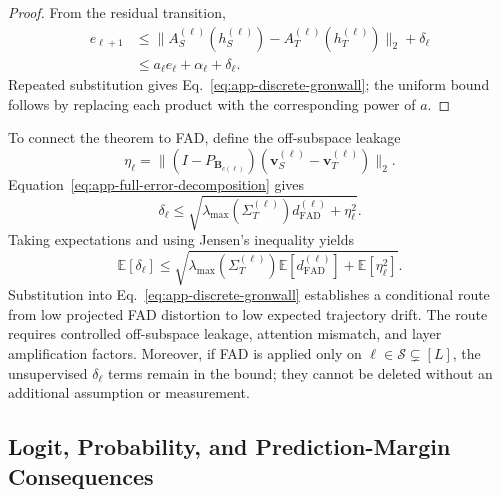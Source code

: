 \documentclass{article}
\newcommand{\E}{\mathbb{E}}
\newcommand{\calS}{\mathcal{S}}
\newcommand{\FAD}{\mathrm{FAD}}
\newcommand{\bB}{\boldsymbol{B}}
\newcommand{\bv}{\boldsymbol{v}}
\newcommand{\bSigma}{\varSigma}
\newcommand{\bI}{I}
\theoremstyle{plain}
\theoremstyle{definition}
\theoremstyle{remark}
\begin{document}
\begin{proof}
From the residual transition,
\begin{equation}
\begin{aligned}
  e_{\ell+1}
  &\le\|A_S^{(\ell)}(h_S^{(\ell)})-
  A_T^{(\ell)}(h_T^{(\ell)})\|_2+\delta_\ell\\
  &\le a_\ell e_\ell+\alpha_\ell+\delta_\ell.
  \label{eq:app-one-step-recursion}
\end{aligned}
\end{equation}
Repeated substitution gives Eq.~\eqref{eq:app-discrete-gronwall}; the uniform
bound follows by replacing each product with the corresponding power of $a$.
\end{proof}

To connect the theorem to FAD, define the off-subspace leakage
\begin{equation}
  \eta_\ell=\|(\bI-P_{\bB_{c(\ell)}})
  (\bv_S^{(\ell)}-\bv_T^{(\ell)})\|_2.
  \label{eq:app-layer-leakage}
\end{equation}
Equation~\eqref{eq:app-full-error-decomposition} gives
\begin{equation}
  \delta_\ell
  \le\sqrt{\lambda_{\max}(\bSigma_T^{(\ell)})
  d_{\FAD}^{(\ell)}+\eta_\ell^2}.
  \label{eq:app-fad-to-ambient}
\end{equation}
Taking expectations and using Jensen's inequality yields
\begin{equation}
  \E[\delta_\ell]
  \le\sqrt{\lambda_{\max}(\bSigma_T^{(\ell)})
  \E[d_{\FAD}^{(\ell)}]+\E[\eta_\ell^2]}.
  \label{eq:app-expected-fad-to-ambient}
\end{equation}
Substitution into Eq.~\eqref{eq:app-discrete-gronwall} establishes a conditional
route from low projected FAD distortion to low expected trajectory drift.  The
route requires controlled off-subspace leakage, attention mismatch, and layer
amplification factors.  Moreover, if FAD is applied only on
$\ell\in\calS\subsetneq[L]$, the unsupervised $\delta_\ell$ terms remain in the
bound; they cannot be deleted without an additional assumption or measurement.

\subsection{Logit, Probability, and Prediction-Margin Consequences}
\label{app:output-stability}
\end{document}
